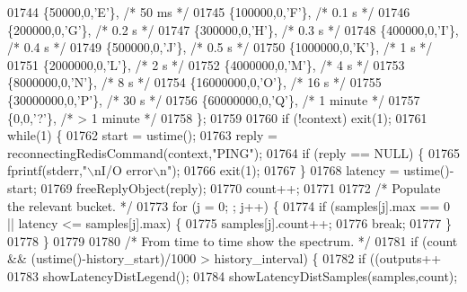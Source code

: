 \begin{DoxyCode}
{{{{{{{{{{{{{{{{{{{{{{{{{{{{{{{{{{{{{{{{{{{{{{{01744         \{50000,0,\textcolor{stringliteral}{'E'}\},      \textcolor{comment}{/* 50 ms */}
01745         \{100000,0,\textcolor{stringliteral}{'F'}\},     \textcolor{comment}{/* 0.1 s */}
01746         \{200000,0,\textcolor{stringliteral}{'G'}\},     \textcolor{comment}{/* 0.2 s */}
01747         \{300000,0,\textcolor{stringliteral}{'H'}\},     \textcolor{comment}{/* 0.3 s */}
01748         \{400000,0,\textcolor{stringliteral}{'I'}\},     \textcolor{comment}{/* 0.4 s */}
01749         \{500000,0,\textcolor{stringliteral}{'J'}\},     \textcolor{comment}{/* 0.5 s */}
01750         \{1000000,0,\textcolor{stringliteral}{'K'}\},    \textcolor{comment}{/* 1 s */}
01751         \{2000000,0,\textcolor{stringliteral}{'L'}\},    \textcolor{comment}{/* 2 s */}
01752         \{4000000,0,\textcolor{stringliteral}{'M'}\},    \textcolor{comment}{/* 4 s */}
01753         \{8000000,0,\textcolor{stringliteral}{'N'}\},    \textcolor{comment}{/* 8 s */}
01754         \{16000000,0,\textcolor{stringliteral}{'O'}\},   \textcolor{comment}{/* 16 s */}
01755         \{30000000,0,\textcolor{stringliteral}{'P'}\},   \textcolor{comment}{/* 30 s */}
01756         \{60000000,0,\textcolor{stringliteral}{'Q'}\},   \textcolor{comment}{/* 1 minute */}
01757         \{0,0,\textcolor{stringliteral}{'?'}\},          \textcolor{comment}{/* > 1 minute */}
01758     \};
01759 
01760     \textcolor{keywordflow}{if} (!context) exit(1);
01761     \textcolor{keywordflow}{while}(1) \{
01762         start = ustime();
01763         reply = reconnectingRedisCommand(context,\textcolor{stringliteral}{"PING"});
01764         \textcolor{keywordflow}{if} (reply == NULL) \{
01765             fprintf(stderr,\textcolor{stringliteral}{"\(\backslash\)nI/O error\(\backslash\)n"});
01766             exit(1);
01767         \}
01768         latency = ustime()-start;
01769         freeReplyObject(reply);
01770         count++;
01771 
01772         \textcolor{comment}{/* Populate the relevant bucket. */}
01773         \textcolor{keywordflow}{for} (j = 0; ; j++) \{
01774             \textcolor{keywordflow}{if} (samples[j].max == 0 || latency <= samples[j].max) \{
01775                 samples[j].count++;
01776                 \textcolor{keywordflow}{break};
01777             \}
01778         \}
01779 
01780         \textcolor{comment}{/* From time to time show the spectrum. */}
01781         \textcolor{keywordflow}{if} (count && (ustime()-history\_start)/1000 > history\_interval) \{
01782             \textcolor{keywordflow}{if} ((outputs++ %
01783                 showLatencyDistLegend();
01784             showLatencyDistSamples(samples,count);
}}}}}}}}}}}}}}}}}}}}}}}}}}}}}}}}}}}}}}}}}}}}}}}
\end{DoxyCode}
